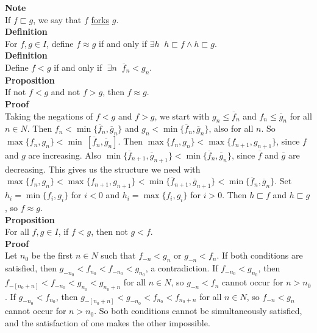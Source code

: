 \documentclass{article}
\newcommand{\nat}{ N}
\newcommand{\zeqs}{ I}
\newcommand{\of}{ \overline f}
\newcommand{\og}{ \overline g}
\newcommand{\forks}{ \sqsubset}
\begin{document}
\textbf{Note}\\
If $f \forks g$, we say that $f$ \underline{forks} $g$.\\

\textbf{Definition}\\
For $f,g \in \zeqs$, define $f \approx g$ if and only if $\exists h \;\; h \sqsubset f \wedge h \sqsubset g $.\\

\textbf{Definition}\\
Define $f < g$ if and only if $\;\exists n \;\;  \of_n < g_n $.\\

\textbf{Proposition}\\
If not $f < g$ and not $f > g$, then $f \approx g$.\\ 

\textbf{Proof}\\
Taking the negations of $f < g$ and $f > g$, we start with $g_n \le \of_n$ and $f_n \le \og_n $ for all $n \in \nat$. Then $f_n < \min\{\of_n,\og_n\}$ and $g_n < \min\{\of_n,\og_n\}$, also for all $n$.
So $\max\{f_n,g_n\} < \min\ [\of_n,\og_n ] $. Then $\max\{f_n,g_n\} < \max\{f_{n+1},g_{n+1}\}$, since $f$ and $g$ are increasing.
Also $\min\{\of_{n+1},\og_{n+1}\}  < \min\{\of_n,\og_n\}$, since $\of$ and $\og$ are decreasing. This gives us the structure we need with $ \max\{f_n,g_n\} < \max\{f_{n+1},g_{n+1}\} < \min\{\of_{n+1},\og_{n+1}\}  < \min\{\of_n,\og_n\}$.  Set $h_i = \min\{f_i,g_i\}$ for $i < 0$ and $h_i = \max\{f_i,g_i\}$ for $ i > 0$. Then $h \forks f$ and $h \forks g$, so $f \approx g$.\\

\textbf{Proposition}\\
For all $f,g \in \zeqs$, if $f < g$, then not $g < f$.\\

\textbf{Proof}\\
Let $n_0$ be the first $n \in \nat$ such that $f_{-n} < g_n$ or $g_{-n} < f_n$. If both conditions are satisfied, then $g_{-n_0} < f_{n_0} < f_{-n_0} < g_{n_0}$, a contradiction. If $f_{-n_0} < g_{n_0}$, then $f_{-[n_0 + n]} < f_{-n_0} < g_{n_0} < g_{n_0 + n}$ for all $n \in \nat$, so $g_{-n} < f_n$ cannot occur for $n > n_0$. If $g_{-n_0} < f_{n_0}$, then $g_{-[n_0 + n]} < g_{-n_0} < f_{n_0} < f_{n_0 + n}$ for all $n \in \nat$, so $f_{-n} < g_n$ cannot occur for $n > n_0$. So both conditions cannot be simultaneously satisfied, and the satisfaction of one makes the other impossible. \\
\end{document}
